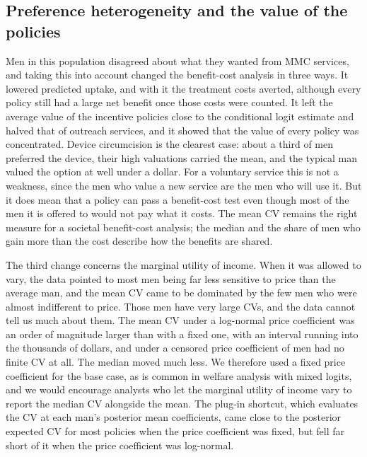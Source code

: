 \documentclass[11pt]{article}
\numberwithin{equation}{section}\numberwithin{figure}{section}\numberwithin{table}{section}
\begin{document}
\subsection{Preference heterogeneity and the value of the policies}
Men in this population disagreed about what they wanted from MMC services, and taking this into account changed the benefit-cost analysis in three ways. It lowered predicted uptake, and with it the treatment costs averted, although every policy still had a large net benefit once those costs were counted. It left the average value of the incentive policies close to the conditional logit estimate and halved that of outreach services, and it showed that the value of every policy was concentrated. Device circumcision is the clearest case: about a third of men preferred the device, their high valuations carried the mean, and the typical man valued the option at well under a dollar. For a voluntary service this is not a weakness, since the men who value a new service are the men who will use it. But it does mean that a policy can pass a benefit-cost test even though most of the men it is offered to would not pay what it costs. The mean CV remains the right measure for a societal benefit-cost analysis; the median and the share of men who gain more than the cost describe how the benefits are shared.

The third change concerns the marginal utility of income. When it was allowed to vary, the data pointed to most men being far less sensitive to price than the average man, and the mean CV came to be dominated by the few men who were almost indifferent to price. Those men have very large CVs, and the data cannot tell us much about them. The mean CV under a log-normal price coefficient was an order of magnitude larger than with a fixed one, with an interval running into the thousands of dollars, and under a censored price coefficient \mmcMXcensZero{} of men had no finite CV at all. The median moved much less. We therefore used a fixed price coefficient for the base case, as is common in welfare analysis with mixed logits, and we would encourage analysts who let the marginal utility of income vary to report the median CV alongside the mean.\cite{DalyHessTrain2012} The plug-in shortcut, which evaluates the CV at each man's posterior mean coefficients, came close to the posterior expected CV for most policies when the price coefficient was fixed, but fell far short of it when the price coefficient was log-normal.
\end{document}
